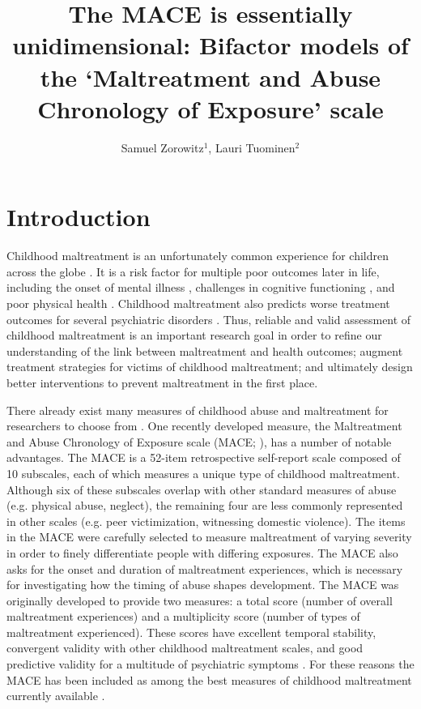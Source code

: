 \documentclass[letterpaper,man,natbib,floatsintext,longtable]{apa6}
\title{The MACE is essentially unidimensional: Bifactor models of the `Maltreatment and Abuse Chronology of Exposure' scale}
\author{Samuel Zorowitz$^1$, Lauri Tuominen$^{2}$}
\affiliation{$^1$Princeton Neuroscience Institute, Princeton University, USA\\$^2$The Royal’s Institute of Mental Health Research, University of Ottawa, Canada}
\begin{document}
\maketitle

\section{Introduction}

Childhood maltreatment is an unfortunately common experience for children across the globe \citep{stoltenborgh2015prevalence}. It is a risk factor for multiple poor outcomes later in life, including the onset of mental illness \citep{kessler2010childhood}, challenges in cognitive functioning \citep{su2019does}, and poor physical health \citep{wegman2009meta}. Childhood maltreatment also predicts worse treatment outcomes for several psychiatric disorders \citep{nanni2012childhood, thomas2019childhood}. Thus, reliable and valid assessment of childhood maltreatment is an important research goal in order to refine our understanding of the link between maltreatment and health outcomes; augment treatment strategies for victims of childhood maltreatment; and ultimately design better interventions to prevent maltreatment in the first place. 

There already exist many measures of childhood abuse and maltreatment for researchers to choose from \citep{saini2019systematic}. One recently developed measure, the Maltreatment and Abuse Chronology of Exposure scale (MACE; \citealt{teicher2015maltreatment}), has a number of notable advantages. The MACE is a 52-item retrospective self-report scale composed of 10 subscales, each of which measures a unique type of childhood maltreatment. Although six of these subscales overlap with other standard measures of abuse (e.g. physical abuse, neglect), the remaining four are less commonly represented in other scales (e.g. peer victimization, witnessing domestic violence). The items in the MACE were carefully selected to measure maltreatment of varying severity in order to finely differentiate people with differing exposures. The MACE also asks for the onset and duration of maltreatment experiences, which is necessary for investigating how the timing of abuse shapes development. The MACE was originally developed to provide two measures: a total score (number of overall maltreatment experiences) and a multiplicity score (number of types of maltreatment experienced). These scores have excellent temporal stability, convergent validity with other childhood maltreatment scales, and good predictive validity for a multitude of psychiatric symptoms \citep{teicher2015maltreatment}. For these reasons the MACE has been included as among the best measures of childhood maltreatment currently available \citep{saini2019systematic, georgieva2022systematic}.
\end{document}
